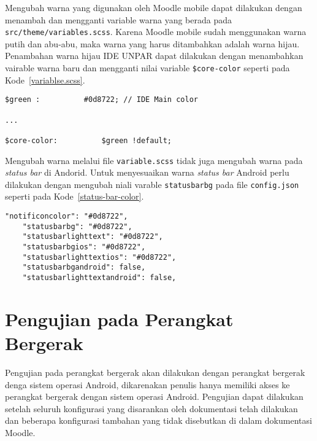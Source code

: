 Mengubah warna yang digunakan oleh Moodle mobile dapat dilakukan dengan menambah dan mengganti variable warna yang berada pada \texttt{src/theme/variables.scss}. Karena Moodle mobile sudah menggunakan warna putih dan abu-abu, maka warna yang harus ditambahkan adalah warna hijau. Penambahan warna hijau IDE UNPAR dapat dilakukan dengan menambahkan vairable warna baru dan mengganti nilai variable \texttt{\$core-color} seperti pada \mbox{Kode \ref{variablse.scss}}.

\begin{lstlisting}[frame=single, label ={variable.scss}, caption = Mengubah warna utama menjadi warna hijau ]
$green :          #0d8722; // IDE Main color

... 

$core-color:          $green !default;
\end{lstlisting}

Mengubah warna melalui file \texttt{variable.scss} tidak juga mengubah warna pada \textit{status bar} di Andorid. Untuk menyesuaikan warna \textit{status bar} Android perlu dilakukan dengan mengubah niali varable \texttt{statusbarbg} pada file \texttt{config.json} seperti pada \mbox{Kode \ref{status-bar-color}}. 

\begin{lstlisting}[frame=single, label ={status-bar-color}, caption = Variable untuk mengubah warna dari \textit{status bar} pada config.json ]
    "notificoncolor": "#0d8722",
    "statusbarbg": "#0d8722",
    "statusbarlighttext": "#0d8722",
    "statusbarbgios": "#0d8722",
    "statusbarlighttextios": "#0d8722",
    "statusbarbgandroid": false,
    "statusbarlighttextandroid": false,
\end{lstlisting}

\section{Pengujian pada Perangkat Bergerak}
Pengujian pada perangkat bergerak akan dilakukan dengan perangkat bergerak denga sistem operasi Android, dikarenakan penulis hanya memiliki akses ke perangkat bergerak dengan sistem operasi Android. Pengujian dapat dilakukan setelah seluruh konfigurasi yang disarankan oleh dokumentasi telah dilakukan dan beberapa konfigurasi tambahan yang tidak disebutkan di dalam dokumentasi Moodle.


